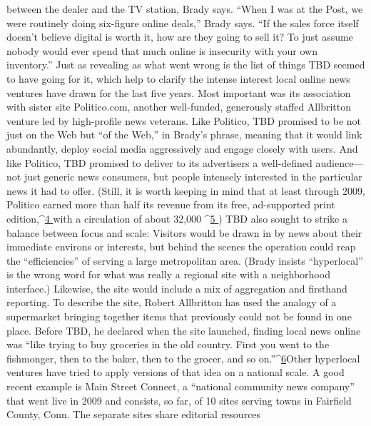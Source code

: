 between the dealer and the TV station, Brady says.
``When I was at the Post, we were routinely doing six-figure online deals,''
Brady says. ``If the sales force itself doesn’t believe digital is worth it, how are they
going to sell it? To just assume nobody would ever spend that much online is
insecurity with your own inventory.''
Just as revealing as what went wrong is the list of things TBD seemed to have
going for it, which help to clarify the intense interest local online news ventures
have drawn for the last five years. Most important was its association with sister
site Politico.com, another well-funded, generously staffed Allbritton venture led
by high-profile news veterans. Like Politico, TBD promised to be not just on the
Web but ``of the Web,'' in Brady’s phrase, meaning that it would link abundantly,
deploy social media aggressively and engage closely with users. And like Politico,
TBD promised to deliver to its advertisers a well-defined audience—not just
generic news consumers, but people intensely interested in the particular news it
had to offer. (Still, it is worth keeping in mind that at least through 2009, Politico
earned more than half its revenue from its free, ad-supported print edition,^{\href{#endnotes-ch3}{4 }}with
a circulation of about 32,000 ^{\href{#endnotes-ch3}{5 }})
TBD also sought to strike a balance between focus and scale: Visitors would
be drawn in by news about their immediate environs or interests, but behind the
scenes the operation could reap the ``efficiencies'' of serving a large metropolitan
area. (Brady insists ``hyperlocal'' is the wrong word for what was really a regional
site with a neighborhood interface.) Likewise, the site would include a mix of
aggregation and firsthand reporting. To describe the site, Robert Allbritton has
used the analogy of a supermarket bringing together items that previously could
not be found in one place. Before TBD, he declared when the site launched, finding
local news online was ``like trying to buy groceries in the old country. First
you went to the fishmonger, then to the baker, then to the grocer, and so on.''^{\href{#endnotes-ch3}{6}}Other hyperlocal ventures have tried to apply versions of that idea on a national
scale. A good recent example is Main Street Connect, a ``national community
news company'' that went live in 2009 and consists, so far, of 10 sites serving
towns in Fairfield County, Conn. The separate sites share editorial resources

